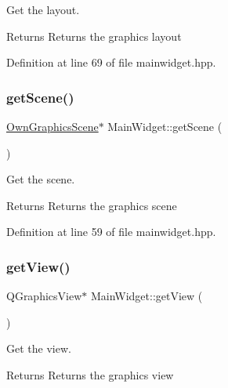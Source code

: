 Get the layout. 

\begin{DoxyReturn}{Returns}
Returns the graphics layout 
\end{DoxyReturn}


Definition at line 69 of file mainwidget.\+hpp.

\mbox{\label{classMainWidget_ad40a8bd13b501a0ebe88c87426a5b591}} 
\subsubsection{\texorpdfstring{get\+Scene()}{getScene()}}
{\footnotesize\ttfamily \mbox{\hyperlink{classOwnGraphicsScene}{Own\+Graphics\+Scene}}$\ast$ Main\+Widget\+::get\+Scene (\begin{DoxyParamCaption}{ }\end{DoxyParamCaption})\hspace{0.3cm}{\ttfamily [inline]}}



Get the scene. 

\begin{DoxyReturn}{Returns}
Returns the graphics scene 
\end{DoxyReturn}


Definition at line 59 of file mainwidget.\+hpp.

\mbox{\label{classMainWidget_ae73e3dac6fb1e99dabe84aab683b3fbd}} 
\subsubsection{\texorpdfstring{get\+View()}{getView()}}
{\footnotesize\ttfamily Q\+Graphics\+View$\ast$ Main\+Widget\+::get\+View (\begin{DoxyParamCaption}{ }\end{DoxyParamCaption})\hspace{0.3cm}{\ttfamily [inline]}}



Get the view. 

\begin{DoxyReturn}{Returns}
Returns the graphics view 
\end{DoxyReturn}


